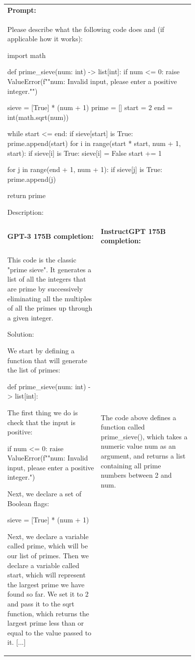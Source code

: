 \begin{figure}[hp]
    \centering
    \small
    \begin{tabular}{p{0.45\linewidth} p{0.45\linewidth}}
    \toprule 
         \multicolumn{2}{l}{\textbf{Prompt:} }  \\
         \multicolumn{2}{p{0.95\linewidth}}{Please describe what the following code does and (if applicable how it works):

import math

def prime\_sieve(num: int) -> list[int]:
  if num <= 0:
    raise ValueError(f""{num}: Invalid input, please enter a positive integer."")

  sieve = [True] * (num + 1)
  prime = []
  start = 2
  end = int(math.sqrt(num))

  while start <= end:
    if sieve[start] is True:
      prime.append(start)
      for i in range(start * start, num + 1, start):
        if sieve[i] is True:
          sieve[i] = False
    start += 1

  for j in range(end + 1, num + 1):
    if sieve[j] is True:
      prime.append(j)

  return prime

Description:
         }  \\ \midrule 
        \textbf{GPT-3 175B completion:} & \textbf{InstructGPT 175B completion:} \\
    
This code is the classic "prime sieve". It generates a list of all the integers that are prime by successively eliminating all the multiples of all the primes up through a given integer.

Solution:

We start by defining a function that will generate the list of primes:

def prime\_sieve(num: int) -> list[int]:

The first thing we do is check that the input is positive:

if num <= 0:    raise ValueError(f""{num}: Invalid input, please enter a positive integer.")

Next, we declare a set of Boolean flags:

sieve = [True] * (num + 1)

Next, we declare a variable called prime, which will be our list of primes. Then we declare a variable called start, which will represent the largest prime we have found so far. We set it to 2 and pass it to the sqrt function, which returns the largest prime less than or equal to the value passed to it. [...]
         &
         The code above defines a function called prime\_sieve(), which takes a numeric value num as an argument, and returns a list containing all prime numbers between 2 and num.


\end{tabular}
\end{figure}
